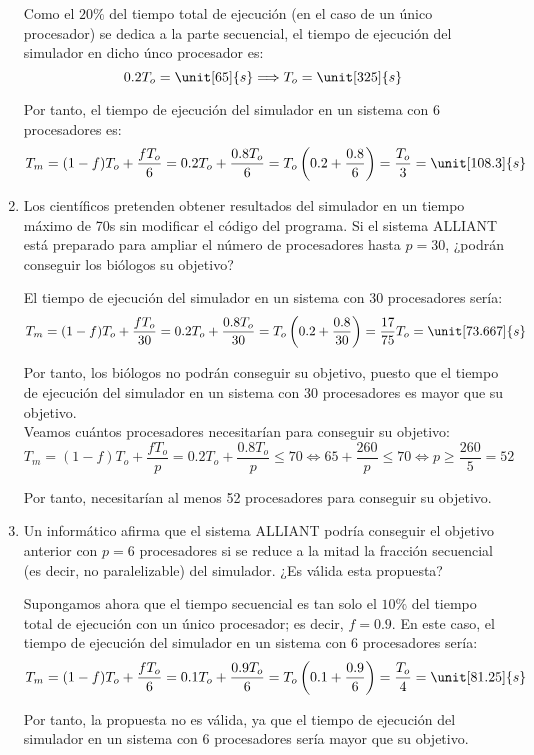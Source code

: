 \begin{ejercicio}
\begin{enumerate}
    Como el $20\%$ del tiempo total de ejecución (en el caso de un único procesador) se dedica a la parte secuencial, el tiempo de ejecución del simulador en dicho únco procesador es:
    \begin{equation*}
        0.2T_o = \unit[65]{s}\Longrightarrow T_o = \unit[325]{s}
    \end{equation*}

    Por tanto, el tiempo de ejecución del simulador en un sistema con 6 procesadores es:
    \begin{equation*}
        T_m = (1-f)T_o + \dfrac{fT_o}{6} = 0.2T_o + \dfrac{0.8T_o}{6} = T_o\left(0.2 + \dfrac{0.8}{6}\right) = \dfrac{T_o}{3} = \unit[108.3]{s}
    \end{equation*}
    \item Los científicos pretenden obtener resultados del simulador en un tiempo máximo de 70s sin modificar el código del programa. Si el sistema ALLIANT está preparado para ampliar el número de procesadores hasta $p = 30$, ¿podrán conseguir los biólogos su objetivo?
    
    El tiempo de ejecución del simulador en un sistema con 30 procesadores sería:
    \begin{equation*}
        T_m = (1-f)T_o + \dfrac{fT_o}{30} = 0.2T_o + \dfrac{0.8T_o}{30} = T_o\left(0.2 + \dfrac{0.8}{30}\right) = \dfrac{17}{75}T_o = \unit[73.667]{s}
    \end{equation*}

    Por tanto, los biólogos no podrán conseguir su objetivo, puesto que el tiempo de ejecución del simulador en un sistema con 30 procesadores es mayor que su objetivo.\\

    Veamos cuántos procesadores necesitarían para conseguir su objetivo:
    \begin{equation*}
        T_m = (1-f)T_o + \dfrac{fT_o}{p} = 0.2T_o + \dfrac{0.8T_o}{p}\leq 70\iff
        65+\dfrac{260}{p}\leq 70\iff p\geq \dfrac{260}{5} = 52
    \end{equation*}

    Por tanto, necesitarían al menos 52 procesadores para conseguir su objetivo.
    \item Un informático afirma que el sistema ALLIANT podría conseguir el objetivo anterior con $p = 6$ procesadores si se reduce a la mitad la fracción secuencial (es decir, no paralelizable) del simulador. ¿Es válida esta propuesta?
    
    Supongamos ahora que el tiempo secuencial es tan solo el $10\%$ del tiempo total de ejecución con un único procesador; es decir, $f = 0.9$. En este caso, el tiempo de ejecución del simulador en un sistema con 6 procesadores sería:
    \begin{equation*}
        T_m = (1-f)T_o + \dfrac{fT_o}{6} = 0.1T_o + \dfrac{0.9T_o}{6} = T_o\left(0.1 + \dfrac{0.9}{6}\right) = \dfrac{T_o}{4} = \unit[81.25]{s}
    \end{equation*}

    Por tanto, la propuesta no es válida, ya que el tiempo de ejecución del simulador en un sistema con 6 procesadores sería mayor que su objetivo.
\end{enumerate}
\end{ejercicio}
